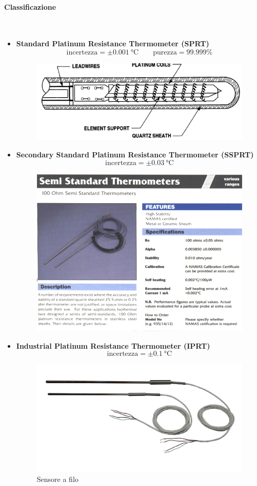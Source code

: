 \documentclass[a4paper, 15pt]{article}
\begin{document}
\begin{adjustwidth}{2in}{}
	\paragraph{Classificazione} \mbox{} \\
	\begin{itemize}
		\item \textbf{Standard Platinum Resistance Thermometer (SPRT)}
		\[\text{incertezza} = \pm\SI{0.001}{\celsius}\qquad\text{purezza} = 99.999\%\]
		\begin{figure}[H]
			\centering
			\includegraphics[width=0.5\linewidth]{immagini/screenshot007}
			\label{fig:screenshot007}
		\end{figure}
		\item \textbf{Secondary Standard Platinum Resistance Thermometer (SSPRT)}
		\[\text{incertezza} = \pm\SI{0.03}{\celsius}\]
		\begin{figure}[H]
			\centering
			\includegraphics[width=0.5\linewidth]{immagini/screenshot008}
			\label{fig:screenshot008}
		\end{figure}
		\item \textbf{Industrial Platinum Resistance Thermometer (IPRT)}
		\[\text{incertezza} = \pm\SI{0.1}{\celsius}\]
		\begin{figure}[H]
			\centering
			\includegraphics[width=0.3\linewidth]{immagini/screenshot009}
			\caption{Sensore a filo}
			\label{fig:screenshot009}
		\end{figure}
		\begin{figure}[H]

\end{figure}
\end{itemize}
\end{adjustwidth}
\end{document}
